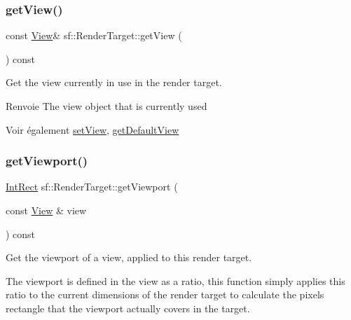 \mbox{\label{classsf_1_1RenderTarget_a2c179503b4dcdf5282ef6426d317602c}} 
\subsubsection{\texorpdfstring{get\+View()}{getView()}}
{\footnotesize\ttfamily const \hyperlink{classsf_1_1View}{View}\& sf\+::\+Render\+Target\+::get\+View (\begin{DoxyParamCaption}{ }\end{DoxyParamCaption}) const}



Get the view currently in use in the render target. 

\begin{DoxyReturn}{Renvoie}
The view object that is currently used
\end{DoxyReturn}
\begin{DoxySeeAlso}{Voir également}
\hyperlink{classsf_1_1RenderTarget_a063db6dd0a14913504af30e50cb6d946}{set\+View}, \hyperlink{classsf_1_1RenderTarget_ad3b533c3f899d7044d981ed607aef9be}{get\+Default\+View} 
\end{DoxySeeAlso}
\mbox{\label{classsf_1_1RenderTarget_a865d462915dc2a1fae2ebfb3300382ac}} 
\subsubsection{\texorpdfstring{get\+Viewport()}{getViewport()}}
{\footnotesize\ttfamily \hyperlink{classsf_1_1Rect}{Int\+Rect} sf\+::\+Render\+Target\+::get\+Viewport (\begin{DoxyParamCaption}\item[{const \hyperlink{classsf_1_1View}{View} \&}]{view }\end{DoxyParamCaption}) const}



Get the viewport of a view, applied to this render target. 

The viewport is defined in the view as a ratio, this function simply applies this ratio to the current dimensions of the render target to calculate the pixels rectangle that the viewport actually covers in the target.


